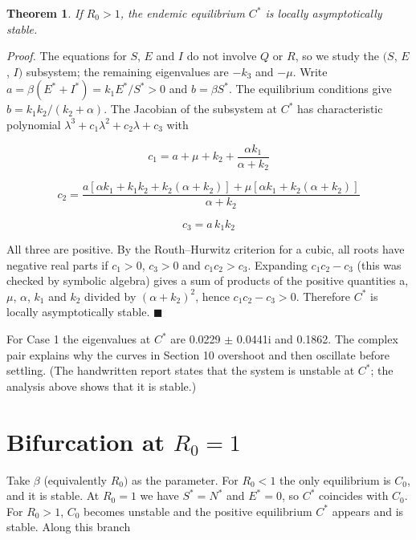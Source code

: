 \documentclass[12pt,a4paper]{article}
\newtheorem{theorem}{Theorem}
\theoremstyle{definition}
\begin{document}
\begin{theorem}
If $R_{0} > 1$, the endemic equilibrium $C^*$ is locally asymptotically stable.
\end{theorem}

\textit{Proof.} The equations for $S$, $E$ and $I$ do not involve $Q$ or $R$, so we study the $(S$, $E$, $I)$ subsystem; the remaining eigenvalues are $-k_{3}$ and $-\mu$. Write $a = \beta (E^* + I^*) = k_{1}E^*/S^* > 0$ and $b = \beta S^*$. The equilibrium conditions give $b = k_{1}k_{2}/(k_{2} + \alpha )$. The Jacobian of the subsystem at $C^*$ has characteristic polynomial $\lambda ^{3} + c_{1}\lambda ^{2} + c_{2}\lambda + c_{3}$ with

\begin{equation*}
c_1 = a+\mu+k_2+\frac{\alpha k_1}{\alpha+k_2}
\end{equation*}

\begin{equation*}
c_2 = \frac{a\left[\alpha k_1+k_1k_2+k_2(\alpha+k_2)\right]+\mu\left[\alpha k_1+k_2(\alpha+k_2)\right]}{\alpha+k_2}
\end{equation*}

\begin{equation*}
c_3 = a\,k_1k_2
\end{equation*}

All three are positive. By the Routh–Hurwitz criterion for a cubic, all roots have negative real parts if $c_{1} > 0$, $c_{3} > 0$ and $c_{1}c_{2} > c_{3}$. Expanding $c_{1}c_{2} - c_{3}$ (this was checked by symbolic algebra) gives a sum of products of the positive quantities a, $\mu$, $\alpha$, $k_{1}$ and $k_{2}$ divided by $(\alpha + k_{2})^{2}$, hence $c_{1}c_{2} - c_{3} > 0$. Therefore $C^*$ is locally asymptotically stable. \hfill\ensuremath{\blacksquare}


For Case 1 the eigenvalues at $C^*$ are \textminus{}0.0229 $\pm$ 0.0441i and \textminus{}0.1862. The complex pair explains why the curves in Section 10 overshoot and then oscillate before settling. (The handwritten report states that the system is unstable at $C^*$; the analysis above shows that it is stable.)


\section{Bifurcation at $R_{0} = 1$}

Take $\beta$ (equivalently $R_{0})$ as the parameter. For $R_{0} < 1$ the only equilibrium is $C_{0}$, and it is stable. At $R_{0} = 1$ we have $S^* = N^*$ and $E^* = 0$, so $C^*$ coincides with $C_{0}$. For $R_{0} > 1$, $C_{0}$ becomes unstable and the positive equilibrium $C^*$ appears and is stable. Along this branch
\end{document}
